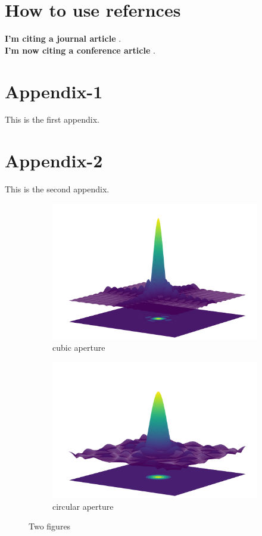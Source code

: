 \documentclass{article}
\begin{document}
\section{How to use refernces}
\lipsum[1]
\textbf{I'm citing a journal article} \cite{GaborHolography}.\\
\lipsum[2]
\textbf{I'm now citing a conference article} \cite{HardReview_84}.



\cleardoublepage


\cleardoublepage
\appendix
\section{Appendix-1}
This is the first appendix.
\lipsum[1]
\section{Appendix-2}
This is the second appendix.
\begin{figure}[H]
	\begin{subfigure}{0.5\linewidth}
		\includegraphics[width = \textwidth]{Figures/Cubic_aperture.png}
		\caption{cubic aperture}
		\label{cubicAperture}
	\end{subfigure}
	\begin{subfigure}{0.5\linewidth}
		\includegraphics[width = \textwidth]{Figures/Circular_aperture.png}
		\caption{circular aperture}
		\label{circularAperture}
	\end{subfigure}
	\caption{Two figures}
\end{figure}
\end{document}
